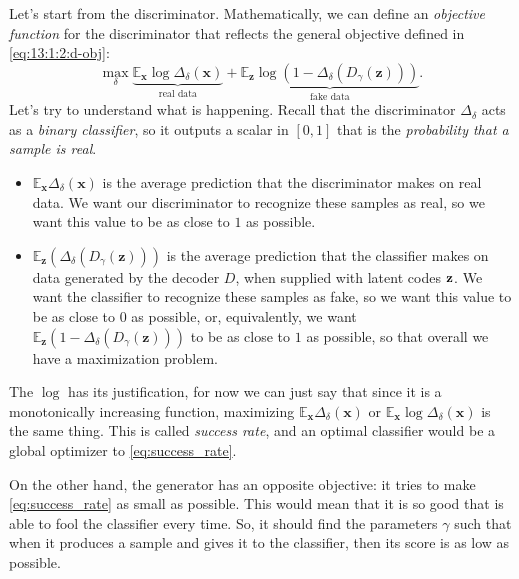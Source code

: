 Let's start from the discriminator. Mathematically, we can define an \emph{objective function} for the discriminator that reflects the general objective defined in \cref{eq:13:1:2:d-obj}:
\begin{equation}
    \label{eq:success_rate}
	\max_\delta \underbrace{\mathbb{E}_{\mathbf{x}} \log \Delta_\delta(\mathbf{x})}_{\text{real data}} + \underbrace{\mathbb{E}_{\mathbf{z}} \log \left( 1 - \Delta_\delta(D_\gamma(\mathbf{z})) \right)}_{\text{fake data}}.
\end{equation}
Let's try to understand what is happening. Recall that the discriminator $\Delta_\delta$ acts as a \emph{binary classifier}, so it outputs a scalar in $[0, 1]$ that is the \emph{probability that a sample is real}. 
\begin{itemize}
    \item $\mathbb{E}_{\mathbf{x}} \Delta_\delta(\mathbf{x})$ is the average prediction that the discriminator makes on real data. We want our discriminator to recognize these samples as real, so we want this value to be as close to $1$ as possible.
    
    \item $\mathbb{E}_{\mathbf{z}} \left( \Delta_\delta(D_\gamma(\mathbf{z})) \right)$ is the average prediction that the classifier makes on data generated by the decoder $D$, when supplied with latent codes $\vb{z}$. We want the classifier to recognize these samples as fake, so we want this value to be as close to $0$ as possible, or, equivalently, we want $\mathbb{E}_{\mathbf{z}} \left( 1 - \Delta_\delta(D_\gamma(\mathbf{z})) \right)$ to be as close to $1$ as possible, so that overall we have a maximization problem.
\end{itemize} 

The $\log$ has its justification, for now we can just say that since it is a monotonically increasing function, maximizing $\mathbb{E}_{\mathbf{x}} \Delta_\delta(\mathbf{x})$ or $\mathbb{E}_{\mathbf{x}} \log \Delta_\delta(\mathbf{x})$ is the same thing. This is called \emph{success rate}, and an optimal classifier would be a global optimizer to \cref{eq:success_rate}.

On the other hand, the generator has an opposite objective: it tries to make \cref{eq:success_rate} as small as possible. This would mean that it is so good that is able to fool the classifier every time. So, it should find the parameters $\gamma$ such that when it produces a sample and gives it to the classifier, then its score is as low as possible.

